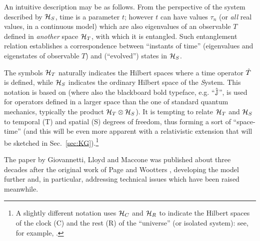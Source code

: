 An intuitive description may be as follows.
From the perspective of the system described by $\mathcal{H}_S$,
time is a parameter $t$;
however $t$ can have values
$\tau_n$ (or \emph{all} real values, in a continuous model)
which are also eigenvalues of an observable $T$ defined in \emph{another} space $\mathcal{H}_T$,
with which it is entangled. Such entanglement relation establishes a correspondence
between ``instants of time'' (eigenvalues and eigenstates of observable $T$)
and (``evolved'') states in $\mathcal{H}_S$.

The symbols $\mathcal{H}_T$ %
naturally indicates
the Hilbert spaces where a time operator $\hat{T}$ is defined,
while $\mathcal{H}_S$ indicates
the ordinary Hilbert space of the \emph{S}ystem.
This notation is based on \citereset\cite{Lloyd:Time}
(where also the blackboard bold typeface, e.g. ``$\hat{\mathbb{J}}$'',
is used for operators defined in a larger space
than the one of standard quantum mechanics,
typically the product $\mathcal{H}_T \otimes \mathcal{H}_S$).
It is tempting to relate $\mathcal{H}_T$ and $\mathcal{H}_S$
to temporal (T) and spatial (S)
degrees of freedom, thus forming a sort of
``space-time'' (and this will be even more apparent
with a relativistic extension that will be sketched in Sec.~\ref{sec:KG}).\footnote{
  A slightly different notation
  uses $\mathcal{H}_C$ and $\mathcal{H}_R$
  to indicate the Hilbert spaces of the clock (C) and the rest (R) of the ``universe''
  (or isolated system):
  see, for example, \cite{Marletto:Evolution}.
}


The paper by Giovannetti, Lloyd and Maccone \citereset\parencite{Lloyd:Time}
was published about three decades after the original work
of Page and Wootters \parencite{PageWootters},
developing the model further and,
in particular,
addressing technical issues which have been raised meanwhile.


